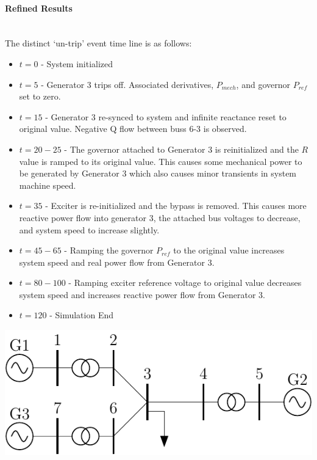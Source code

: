 \documentclass[12pt]{article}
\begin{document}
\paragraph{Refined Results} \ \\
The distinct `un-trip' event time line is as follows:
\begin{itemize}
 em
\item $t=0$ - System initialized
\item $t=5$ - Generator 3 trips off.
Associated derivatives, $P_{mech}$, and governor $P_{ref}$ set to zero.
\item $t=15$ - Generator 3 re-synced to system and infinite reactance reset to original value. 
Negative Q flow between buss 6-3 is observed.
\item $t=20-25$ - The governor attached to Generator 3 is reinitialized and the $R$ value is ramped to its original value. 
This causes some mechanical power to be generated by Generator 3 which also causes minor transients in system machine speed.
\item $t=35$ - Exciter is re-initialized and the bypass is removed.
This causes more reactive power flow into generator 3, the attached bus voltages to decrease, and system speed to increase slightly. 
\item $t=45-65$ - Ramping the governor $P_{ref}$ to the original value increases system speed  and real power flow from Generator 3.
\item $t=80-100$ - Ramping exciter reference voltage to original value decreases system speed and increases reactive power flow from Generator 3.
\item $t=120$ - Simulation End
\end{itemize}
\includegraphics[width=\linewidth]{200831-3mach7bus}

\end{document}

